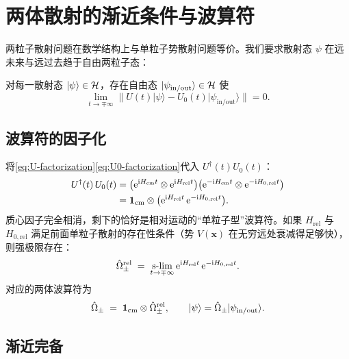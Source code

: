 \section{两体散射的渐近条件与波算符}

两粒子散射问题在数学结构上与单粒子势散射问题等价。我们要求散射态 $\psi$ 在远未来与远过去趋于自由两粒子态：

\begin{definition}[两体渐近条件]
  对每一散射态 $|\psi\rangle\in\mathcal{H}$，存在自由态 $|\psi_{\text{in}/\text{out}}\rangle\in\mathcal{H}$ 使
  \begin{equation}
    \lim_{t\to\mp\infty}\big\| U(t)|\psi\rangle - U_0(t)|\psi_{\text{in}/\text{out}}\rangle \big\| = 0.
    \label{eq:asymptotic-condition-2p}
  \end{equation}
\end{definition}

\subsection{波算符的因子化}

将\eqref{eq:U-factorization}\eqref{eq:U0-factorization}代入 $U^{\dagger}(t)U_0(t)$：
\begin{align}
  U^{\dagger}(t)\,U_0(t)
  &= \big(\mathrm{e}^{\mathrm{i} H_{\text{cm}}t}\otimes \mathrm{e}^{\mathrm{i} H_{\text{rel}}t}\big)
     \big(\mathrm{e}^{-\mathrm{i} H_{\text{cm}}t}\otimes \mathrm{e}^{-\mathrm{i} H_{0,\text{rel}}t}\big) \notag\\
  &= \mathbf{1}_{\text{cm}} \otimes \big(\mathrm{e}^{\mathrm{i} H_{\text{rel}}t}\,\mathrm{e}^{-\mathrm{i} H_{0,\text{rel}}t}\big).
  \label{eq:U-dag-U0-fact}
\end{align}
质心因子完全相消，剩下的恰好是相对运动的“单粒子型”波算符。如果 $H_{\text{rel}}$ 与 $H_{0,\text{rel}}$ 满足前面单粒子散射的存在性条件（势 $V(\bm{x})$ 在无穷远处衰减得足够快），则强极限存在：
\begin{equation}
  \hat{\Omega}_{\pm}^{\text{rel}}
  \;=\; \mathop{\text{s-lim}}_{t\to\mp\infty} \mathrm{e}^{\mathrm{i} H_{\text{rel}}t}\,\mathrm{e}^{-\mathrm{i} H_{0,\text{rel}}t}.
  \label{eq:Omega-rel}
\end{equation}
对应的两体波算符为
\begin{equation}
  \hat{\Omega}_{\pm} \;=\; \mathbf{1}_{\text{cm}} \otimes \hat{\Omega}_{\pm}^{\text{rel}},\qquad
  |\psi\rangle = \hat{\Omega}_{\pm}|\psi_{\text{in}/\text{out}}\rangle.
  \label{eq:Omega-2body}
\end{equation}

\subsection{渐近完备}

